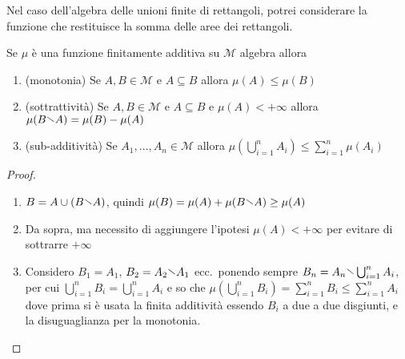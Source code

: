 \begin{example}
    Nel caso dell'algebra delle unioni finite di rettangoli, potrei considerare
    la funzione che restituisce la somma delle aree dei rettangoli.
\end{example}

\begin{proposition}
    Se \(\mu\) è una funzione finitamente additiva su \(\mathcal{M}\) algebra
    allora
\begin{enumerate}[label = \arabic*.]
    \item (monotonia) Se \(A, B \in \mathcal{M}\) e \(A \subseteq B \) allora \(\mu(A) \le
        \mu(B)\) 
    \item (sottrattività) Se \(A, B \in \mathcal{M}\) e \(A \subseteq B \) e \(\mu(A) <
        +\infty\) allora \(\mu(B \sminus A) = \mu(B) - \mu(A)\) 
    \item (sub-additività) Se \(A_{1}, \dots, A_{n} \in \mathcal{M} \) allora \(\mu\left(\bigcup_{i =
        1}^n A_{i}\right) \le \sum_{i=1}^{n} \mu(A_{i})\) 
\end{enumerate}
\end{proposition}
\begin{proof} \(\) 
\begin{enumerate}[label = \arabic*.]
    \item \(B = A \cup (B \sminus A)\), quindi \(\mu(B) = \mu(A) + \mu(B
        \sminus A) \ge \mu(A)\) 
    \item Da sopra, ma necessito di aggiungere l'ipotesi \(\mu(A) < +\infty\)
        per evitare di sottrarre \(+\infty\) 
    \item Considero \(B_{1} = A_{1}\), \(B_{2} = A_{2} \sminus A_{1}\)
        ecc.\ ponendo sempre \(B_{n} = A_{n} \sminus \bigcup_{i=1}^{n}
        A_{i}\), per cui \(\bigcup_{i=1}^{n} B_{i} = \bigcup_{i=1}^{n} A_{i}  \)
        e so che \(\mu(\bigcup_{i=1}^{n} B_{i}) = \sum_{i=1}^{n} B_{i} \le
        \sum_{i=1}^{n} A_{i}\) dove prima si è usata la finita additività
        essendo \(B_{i}\) a due a due disgiunti, e la disuguaglianza per la
        monotonia.
\end{enumerate}
\end{proof}

